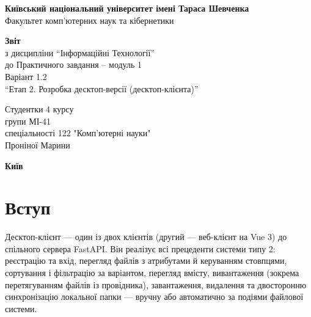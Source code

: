 \documentclass[12pt,a4paper]{article}
\begin{document}
\begin{titlepage}
\centering\large
\textbf{Київський національний університет імені Тараса Шевченка}\\
Факультет комп'ютерних наук та кібернетики

\textbf{Звіт}\\
з дисципліни “Інформаційні Технології”\\
до Практичного завдання -- модуль 1\\
Варіант 1.2\\
“Етап 2. Розробка десктоп-версії (десктоп-клієнта)”

\begin{flushright}
Студентки 4 курсу\\
групи МІ-41\\
спеціальності 122 "Комп’ютерні науки"\\
Проніної Марини
\end{flushright}

\textbf{Київ \the\year}
\end{titlepage}

\begin{abstract}
\noindent
Звіт документує \textbf{десктоп-клієнт} проєкту «Хмарне сховище» (\texttt{cloudfolder/\allowbreak{}desktop/\allowbreak{}}) --- застосунок на Python 3.11 та PySide6 (Qt 6), що працює з віддаленим сервером через REST API. Розглянуто архітектуру клієнта, усі прецеденти зі скріншотами працюючої програми (включно з операцією варіанта 12: сортування за датою модифікації $\blacktriangle$/$\blacktriangledown$ і фільтр «усі / .java / .png», перегляд \texttt{.xml}/\texttt{.png}, drag-n-drop) та модульне тестування: 40 тестів pytest, усі проходять.
\end{abstract}

\tableofcontents
\newpage


\section{Вступ}

Десктоп-клієнт --- один із двох клієнтів (другий --- веб-клієнт на Vue 3) до спільного сервера FastAPI. Він реалізує всі прецеденти системи типу 2: реєстрацію та вхід, перегляд файлів з атрибутами й керуванням стовпцями, сортування і фільтрацію за варіантом, перегляд вмісту, вивантаження (зокрема перетягуванням файлів із провідника), завантаження, видалення та двосторонню синхронізацію локальної папки --- вручну або автоматично за подіями файлової системи.
\end{document}
